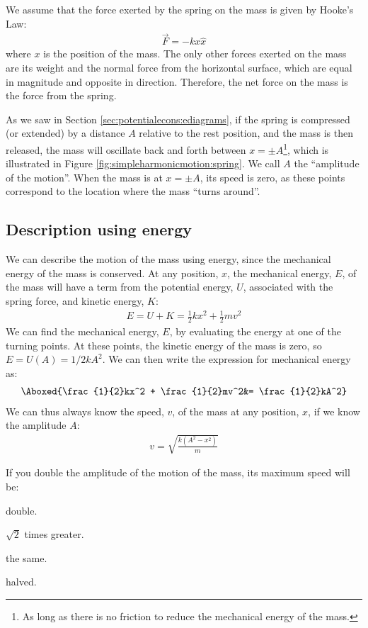 We assume that the force exerted by the spring on the mass is given by Hooke's Law:
\begin{align*}
\vec F = -kx \hat x
\end{align*}
where $x$ is the position of the mass. The only other forces exerted on the mass are its weight and the normal force from the horizontal surface, which are equal in magnitude and opposite in direction. Therefore, the net force on the mass is the force from the spring. 

As we saw in Section \ref{sec:potentialecons:ediagrams}, if the spring is compressed  (or extended) by a distance $A$ relative to the rest position, and the mass is then released, the mass will oscillate back and forth between $x=\pm A$\footnote{As long as there is no friction to reduce the mechanical energy of the mass.}, which is illustrated in Figure \ref{fig:simpleharmonicmotion:spring}. We call $A$ the ``amplitude of the motion''. When the mass is at $x=\pm A$, its speed is zero, as these points correspond to the location where the mass ``turns around''.

\subsection{Description using energy}
We can describe the motion of the mass using energy, since the mechanical energy of the mass is conserved. At any position, $x$, the mechanical energy, $E$, of the mass will have a term from the potential energy, $U$, associated with the spring force, and kinetic energy, $K$:
\begin{align*}
E = U + K =\frac{1}{2}kx^2 + \frac{1}{2}mv^2
\end{align*}
We can find the mechanical energy, $E$, by evaluating the energy at one of the turning points. At these points, the  kinetic energy of the mass is zero, so $E=U(A)=1/2kA^2$. We can then write the expression for mechanical energy as:
\begin{align}
\Aboxed{\frac{1}{2}kx^2 + \frac{1}{2}mv^2&= \frac{1}{2}kA^2}
\end{align}
We can thus always know the speed, $v$, of the mass at any position, $x$, if we know the amplitude $A$:
\begin{align*}
v = \sqrt{\frac{k(A^2-x^2)}{m}}
\end{align*}

\begin{checkpoint}
\begin{MCquestion}{If you double the amplitude of the motion of the mass, its maximum speed will be:}
\item double.
\item $\sqrt 2$ times greater. \correct
\item the same.
\item halved.
\end{MCquestion}
\end{checkpoint}

